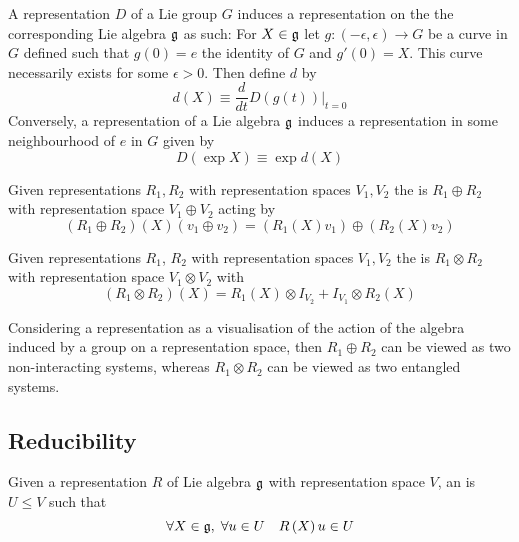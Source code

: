 \documentclass{article}
\begin{document}
\begin{theorem}
A representation $D$ of a Lie group $G$ induces a representation on the the corresponding Lie algebra $\mathfrak{g}$ as such: For $X\in\mathfrak{g}$ let $g:(-\epsilon, \epsilon)\to G$ be a curve in $G$ defined such that $g(0)=e$ the identity of $G$ and $g'(0)=X$. This curve necessarily exists for some $\epsilon>0$. Then define $d$ by \[
d(X)\equiv\frac{d}{dt} D\left(g(t)\right) \vert_{t=0}
\]
Conversely, a representation of a Lie algebra $\mathfrak{g}$ induces a representation in some neighbourhood of $e$ in $G$ given by 
\[
D(\exp{X})\equiv\exp{d(X)}
\]
\end{theorem}

\begin{definition}
Given representations $R_1, R_2$ with representation spaces $V_1, V_2$ the  is $R_1 \oplus R_2$ with representation space $V_1 \oplus V_2$ acting by 
\[
(R_1 \oplus R_2)(X)(v_1 \oplus v_2)=(R_1(X)v_1)\oplus(R_2(X)v_2)
\]
\end{definition}

\begin{definition}
Given representations $R_1$, $R_2$ with representation spaces $V_1, V_2$ the  is $R_1 \otimes R_2$ with representation space $V_1 \otimes V_2$ with
\[
(R_1 \otimes R_2)(X)=R_1(X)\otimes I_{V_2}+I_{V_1}\otimes R_2(X)
\]
\end{definition}

\begin{idea}
Considering a representation as a visualisation of the action of the algebra induced by a  group on a representation space, then $R_1 \oplus R_2$ can be viewed as two non-interacting systems, whereas $R_1 \otimes R_2$ can be viewed as two entangled systems.
\end{idea}

\subsection{Reducibility}
\begin{definition}
Given a representation $R$ of Lie algebra $\mathfrak{g}$ with representation space $V$, an  is $U\leq V$ such that
\[
\forall X\in\mathfrak{g}, \; \forall u\in U \quad R\left(X\right)u\in U
\]
\end{definition}
\end{document}
